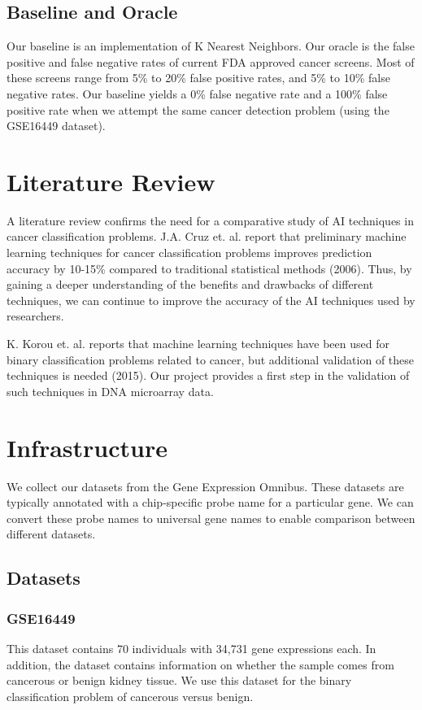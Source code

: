 \documentclass[12pt]{scrartcl}
\begin{document}
    \subsection{Baseline and Oracle}
Our baseline is an implementation of K Nearest Neighbors. Our oracle is the false positive and false negative rates of current FDA approved cancer screens. Most of these screens range from 5\% to 20\% false positive rates, and 5\% to 10\% false negative rates. Our baseline yields a 0\% false negative rate and a 100\% false positive rate when we attempt the same cancer detection problem (using the GSE16449 dataset). 

    \section{Literature Review}
    A literature review confirms the need for a comparative study of AI techniques in cancer classification problems. J.A. Cruz et. al. report that preliminary machine learning techniques for cancer classification problems improves prediction accuracy by 10-15\% compared to traditional statistical methods (2006). Thus, by gaining a deeper understanding of the benefits and drawbacks of different techniques, we can continue to improve the accuracy of the AI techniques used by researchers.
    
    K. Korou et. al. reports that machine learning techniques have been used for binary classification problems related to cancer, but additional validation of these techniques is needed (2015). Our project provides a first step in the validation of such techniques in DNA microarray data.
    \section{Infrastructure}
    We collect our datasets from the Gene Expression Omnibus. These datasets are typically annotated with a chip-specific probe name for a particular gene. We can convert these probe names to universal gene names to enable comparison between different datasets. 
    \subsection{Datasets}
    \subsubsection{GSE16449}
    This dataset contains 70 individuals with 34,731 gene expressions each. In addition, the dataset contains information on whether the sample comes from cancerous or benign kidney tissue. We use this dataset for the binary classification problem of cancerous versus benign.
\end{document}
